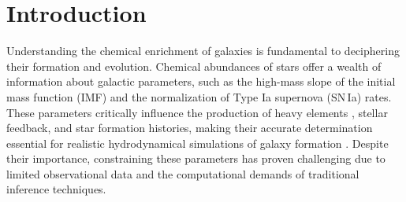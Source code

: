 \documentclass{aa}
\begin{document}

\maketitle
\section{Introduction}

Understanding the chemical enrichment of galaxies is fundamental to deciphering their formation and evolution. Chemical abundances of stars offer a wealth of information about galactic parameters, such as the high-mass slope of the initial mass function (IMF) and the normalization of Type Ia supernova (SN\,Ia) rates. These parameters critically influence the production of heavy elements \citep[e.g.][]{2005A&A...430..491R,2015MNRAS.449.1327V,2015MNRAS.451.3693M}, stellar feedback, and star formation histories, making their accurate determination essential for realistic hydrodynamical simulations of galaxy formation \citep[e.g.][]{Sawala2016,Hopkins2018,Pillepich2018,Buck2020,Buck2020c,Buck2021,Font2020,Agertz2021}. Despite their importance, constraining these parameters has proven challenging due to limited observational data and the computational demands of traditional inference techniques.
\end{document}
